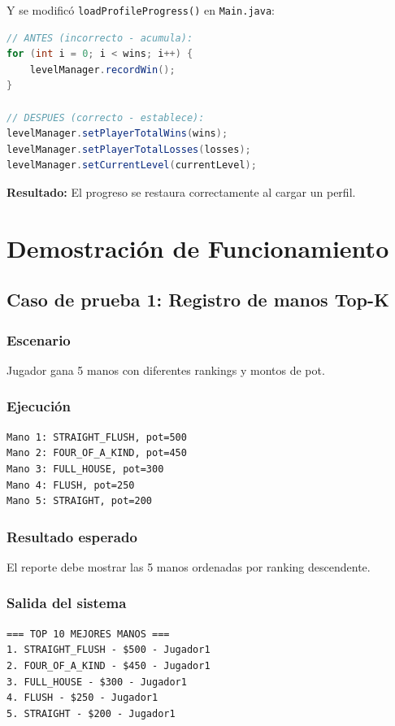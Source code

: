 \documentclass[12pt,a4paper]{article}
\begin{document}
Y se modificó \texttt{loadProfileProgress()} en \texttt{Main.java}:

\begin{lstlisting}[language=Java, caption=Carga correcta de progreso]
// ANTES (incorrecto - acumula):
for (int i = 0; i < wins; i++) {
    levelManager.recordWin();
}

// DESPUES (correcto - establece):
levelManager.setPlayerTotalWins(wins);
levelManager.setPlayerTotalLosses(losses);
levelManager.setCurrentLevel(currentLevel);
\end{lstlisting}

\textbf{Resultado:} El progreso se restaura correctamente al cargar un perfil.

\newpage

\section{Demostración de Funcionamiento}

\subsection{Caso de prueba 1: Registro de manos Top-K}

\subsubsection{Escenario}
Jugador gana 5 manos con diferentes rankings y montos de pot.

\subsubsection{Ejecución}
\begin{verbatim}
Mano 1: STRAIGHT_FLUSH, pot=500
Mano 2: FOUR_OF_A_KIND, pot=450  
Mano 3: FULL_HOUSE, pot=300
Mano 4: FLUSH, pot=250
Mano 5: STRAIGHT, pot=200
\end{verbatim}

\subsubsection{Resultado esperado}
El reporte debe mostrar las 5 manos ordenadas por ranking descendente.

\subsubsection{Salida del sistema}
\begin{verbatim}
=== TOP 10 MEJORES MANOS ===
1. STRAIGHT_FLUSH - $500 - Jugador1
2. FOUR_OF_A_KIND - $450 - Jugador1
3. FULL_HOUSE - $300 - Jugador1
4. FLUSH - $250 - Jugador1
5. STRAIGHT - $200 - Jugador1
\end{verbatim}
\end{document}
